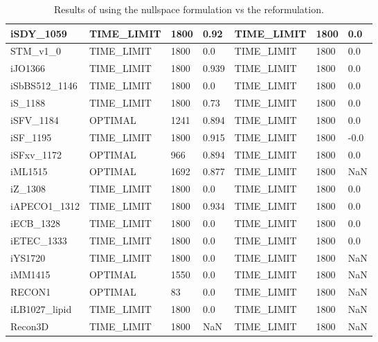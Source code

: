 \begin{table}[!ht]
\begin{tabular}{|l|l|l|l|l|l|l|}
        iSDY\_1059 & TIME\_LIMIT & 1800 & 0.92 & TIME\_LIMIT & 1800 & 0.0 \\ \hline
        STM\_v1\_0 & TIME\_LIMIT & 1800 & 0.0 & TIME\_LIMIT & 1800 & 0.0 \\ \hline
        iJO1366 & TIME\_LIMIT & 1800 & 0.939 & TIME\_LIMIT & 1800 & 0.0 \\ \hline
        iSbBS512\_1146 & TIME\_LIMIT & 1800 & 0.0 & TIME\_LIMIT & 1800 & 0.0 \\ \hline
        iS\_1188 & TIME\_LIMIT & 1800 & 0.73 & TIME\_LIMIT & 1800 & 0.0 \\ \hline
        iSFV\_1184 & OPTIMAL & 1241 & 0.894 & TIME\_LIMIT & 1800 & 0.0 \\ \hline
        iSF\_1195 & TIME\_LIMIT & 1800 & 0.915 & TIME\_LIMIT & 1800 & -0.0 \\ \hline
        iSFxv\_1172 & OPTIMAL & 966 & 0.894 & TIME\_LIMIT & 1800 & 0.0 \\ \hline
        iML1515 & OPTIMAL & 1692 & 0.877 & TIME\_LIMIT & 1800 & NaN \\ \hline
        iZ\_1308 & TIME\_LIMIT & 1800 & 0.0 & TIME\_LIMIT & 1800 & 0.0 \\ \hline
        iAPECO1\_1312 & TIME\_LIMIT & 1800 & 0.934 & TIME\_LIMIT & 1800 & 0.0 \\ \hline
        iECB\_1328 & TIME\_LIMIT & 1800 & 0.0 & TIME\_LIMIT & 1800 & 0.0 \\ \hline
        iETEC\_1333 & TIME\_LIMIT & 1800 & 0.0 & TIME\_LIMIT & 1800 & 0.0 \\ \hline
        iYS1720 & TIME\_LIMIT & 1800 & 0.0 & TIME\_LIMIT & 1800 & NaN \\ \hline
        iMM1415 & OPTIMAL & 1550 & 0.0 & TIME\_LIMIT & 1800 & NaN \\ \hline
        RECON1 & OPTIMAL & 83 & 0.0 & TIME\_LIMIT & 1800 & NaN \\ \hline
        iLB1027\_lipid & TIME\_LIMIT & 1800 & 0.0 & TIME\_LIMIT & 1800 & NaN \\ \hline
        Recon3D & TIME\_LIMIT & 1800 & NaN & TIME\_LIMIT & 1800 & NaN \\ \hline
    \end{tabular}
    \caption{\label{Tab:ll_fba_comparison} Results of using the nullspace formulation vs the reformulation.}
\end{table}


